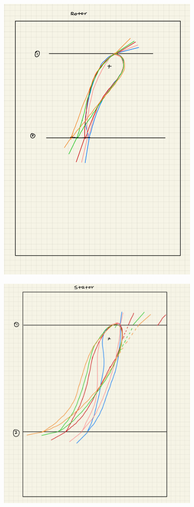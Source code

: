 \documentclass[titlepage]{article}
\begin{document}
\begin{enumerate}
    \begin{center}
        \includegraphics[width=0.75\textwidth]{airfoilstack.png}
    \end{center}

    \begin{center}
        \includegraphics[width=0.75\textwidth]{airfoilstack2.png}
    \end{center}

\end{enumerate}
\end{document}
